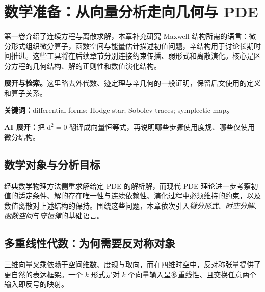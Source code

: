 \documentclass[UTF8,11pt,openany]{ctexbook}
\numberwithin{equation}{chapter}
\theoremstyle{definition}
\theoremstyle{remark}
\newcommand{\dd}{\mathrm d}
\newcommand{\grad}{\operatorname{grad}}
\newcommand{\Div}{\operatorname{div}}
\newcommand{\curl}{\operatorname{curl}}
\newcommand{\studyroute}[3]{%
  \par\smallskip\noindent\textbf{展开与检索。}#1\par
  \noindent\textbf{关键词：}#2。\par
  \noindent\textbf{AI 展开：}#3\par
}
\begin{document}
\mainmatter
\setcounter{chapter}{-1}
\chapter{数学准备：从向量分析走向几何与 PDE}
\label{ch:prelim}
\begin{chaptersummary}
第一卷介绍了连续方程与离散求解，本章补充研究 Maxwell 结构所需的语言：微分形式组织微分算子，函数空间与能量估计描述初值问题，辛结构用于讨论长期时间推进。这些工具将在后续章节分别连接约束传播、弱形式和离散演化。核心是区分方程的几何结构、解的正则性和数值演化结构。
\end{chaptersummary}
\studyroute{这里略去外代数、迹定理与辛几何的一般证明，保留后文使用的定义和算子关系。}{differential forms; Hodge star; Sobolev traces; symplectic map}{把 $\dd^2=0$ 翻译成向量恒等式，再说明哪些步骤使用度规、哪些仅使用微分结构。}
\section{数学对象与分析目标}
经典数学物理方法侧重求解给定 PDE 的解析解，而现代 PDE 理论进一步考察初值的适定条件、解的存在唯一性与连续依赖性、演化过程中必须维持的约束，以及数值离散对上述结构的保持。围绕这些问题，本章依次引入\emph{微分形式}、\emph{时空分解}、\emph{函数空间}与\emph{守恒律}的基础语言。

\begin{center}
\end{center}

\section{多重线性代数：为何需要反对称对象}
三维向量叉乘依赖于空间维数、度规与取向，而在四维时空中，反对称张量提供了更自然的表达框架。一个 $k$ 形式是对 $k$ 个向量输入呈多重线性、且交换任意两个输入即反号的映射。
\end{document}
